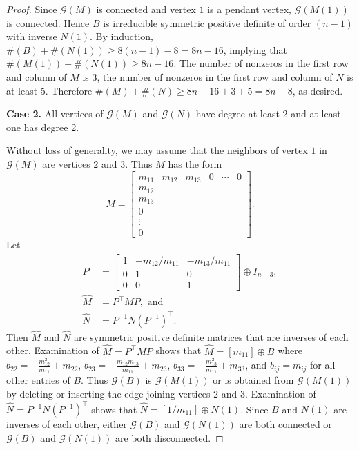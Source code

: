 \documentclass[10pt,a4paper]{amsart}
\newcommand{\G}{\mathcal{G}}
\newcommand{\trans}{^{\top}}
\begin{document}
\begin{proof}
Since $\G(M)$ is connected and vertex $1$ is a pendant vertex, $\G(M(1))$ is connected.
Hence $B$ is irreducible symmetric positive definite of order $(n-1)$ with inverse $N(1)$.
By induction, $\#(B) + \#(N(1))\geq 8(n-1)-8=8n-16$, implying that $\#(M(1))+ \#(N(1)) \geq 8n-16$.
The number of nonzeros in the first row and column of $M$ is 3, the number of nonzeros in the first row and column of $N$ is at least 5.
Therefore $\#(M)+ \#(N)\geq 8n-16 + 3 +5= 8n-8$,
as desired.


\bigskip\noindent 
{\bf Case 2.} All vertices of $\G(M)$ and $\G(N)$ have degree at least 2 and at least one has degree 2. 

Without loss of generality, we may assume that the neighbors of vertex $1$
in $\G(M)$ are vertices $2$ and $3$.  Thus $M$ has the form 
\[
M= \begin{bmatrix}
    m_{11} & m_{12} & m_{13} & 0 & \cdots & 0 \\
    m_{12}\\
    m_{13}
    \\
    0 \\
    \vdots\\
    0
\end{bmatrix}.
\]
Let 
\begin{align*}
P&= \begin{bmatrix}
    1 & -m_{12}/m_{11} & -m_{13}/m_{11}\\
    0 & 1 & 0 \\
    0 & 0 & 1
\end{bmatrix} \oplus I_{n-3},\\
\widehat{M}&= P\trans M P, \mbox{ and }\\
\widehat{N}&= P^{-1} N(P^{-1})\trans.
\end{align*}
Then $\widehat{M}$ and $\widehat{N}$ are symmetric positive definite matrices that are inverses of each other. Examination of $\widehat{M}=P\trans MP$ shows that  $\widehat{M}= [m_{11}] \oplus B$  where $b_{22}=-\frac{m_{12}^2}{m_{11}} + m_{22}$, $b_{23}=-\frac{m_{12}m_{13}}{m_{11}} + m_{23}$, $b_{33}=-\frac{m_{13}^2}{m_{11}} + m_{33}$, and $b_{ij}=m_{ij}$ for all other entries of $B$.
 Thus $\G(B)$ is  $\G(M(1))$ or is obtained from $\G(M(1))$ 
by deleting  or inserting  the edge joining vertices $2$ and $3$. Examination of $\widehat{N}=P^{-1} N (P^{-1})\trans$ shows that $\widehat{N}=
[1/m_{11}] \oplus N(1)$.  Since $B$ and $N(1)$ are inverses of each other, either   $\G(B)$ and $\G(N(1))$ are both connected or $\G(B)$ and $\G(N(1))$ are both disconnected.   


\end{proof}
\end{document}
